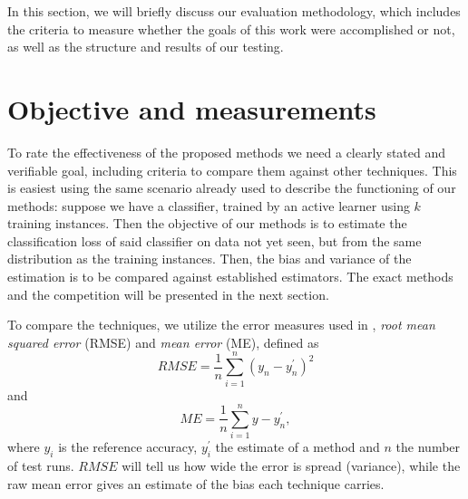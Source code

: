 \label{evaluation}

In this section, we will briefly discuss our evaluation methodology, which includes the criteria to measure whether the goals of this work were accomplished or not, as well as the structure and results of our testing.

\section{Objective and measurements}

To rate the effectiveness of the proposed methods we need a clearly stated and verifiable goal, including criteria to compare them against other techniques. This is easiest using the same scenario already used to describe the functioning of our methods: suppose we have a classifier, trained by an active learner using $k$ training instances. Then the objective of our methods is to estimate the classification loss of said classifier on data not yet seen, but from the same distribution as the training instances. Then, the bias and variance of the estimation is to be compared against established estimators. The exact methods and the competition will be presented in the next section.

To compare the techniques, we utilize the error measures used in \cite{FigueroaEtal2012}, \textit{root mean squared error} (RMSE) and \textit{mean error} (ME), defined as
\begin{equation}
RMSE = \frac{1}{n} \sum_{i=1}^{n} \left(y_n - y_n^{'}\right)^2
\end{equation}
and
\begin{equation}
ME = \frac{1}{n} \sum_{i=1}^{n} y - y_n^{'},
\end{equation}
where $y_i$ is the reference accuracy, $y_i^{'}$ the estimate of a method and $n$ the number of test runs. $RMSE$ will tell us how wide the error is spread (variance), while the raw mean error gives an estimate of the bias each technique carries.

